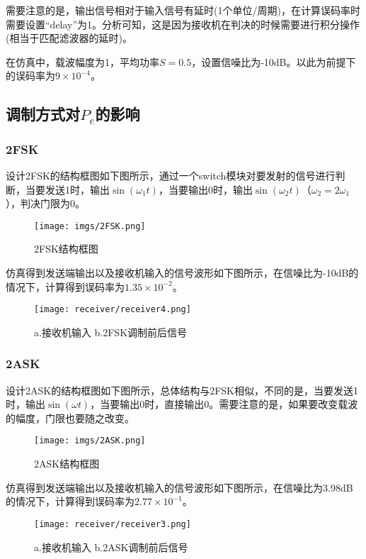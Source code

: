 \documentclass[a4paper]{article}
\begin{document}
需要注意的是，输出信号相对于输入信号有延时(1个单位/周期)，在计算误码率时需要设置“delay”为1。分析可知，这是因为接收机在判决的时候需要进行积分操作(相当于匹配滤波器的延时)。

在仿真中，载波幅度为1，平均功率$S=0.5$，设置信噪比为-10dB。以此为前提下的误码率为$9\times 10^{-4}$。

\subsection{调制方式对$P_e$的影响}
\subsubsection{2FSK}
设计2FSK的结构框图如下图所示，通过一个switch模块对要发射的信号进行判断，当要发送1时，输出$\sin (\omega_1t)$，当要输出0时，输出$\sin (\omega_2t)$（$\omega_2=2\omega_1$），判决门限为0。

\newpage

\begin{figure}[htbp]
\centering
\texttt{[image: imgs/2FSK.png]}
\caption{2FSK结构框图}
\end{figure}

仿真得到发送端输出以及接收机输入的信号波形如下图所示，在信噪比为-10dB的情况下，计算得到误码率为$1.35\times 10^{-2}$。

\begin{figure}[htbp]
\centering
\texttt{[image: receiver/receiver4.png]}
\caption{a.接收机输入 b.2FSK调制前后信号}
\end{figure}


\subsubsection{2ASK}
设计2ASK的结构框图如下图所示，总体结构与2FSK相似，不同的是，当要发送1时，输出$\sin (\omega t)$，当要输出0时，直接输出0。需要注意的是，如果要改变载波的幅度，门限也要随之改变。
\begin{figure}[htbp]
\centering
\texttt{[image: imgs/2ASK.png]}
\caption{2ASK结构框图}
\end{figure}
\newpage

仿真得到发送端输出以及接收机输入的信号波形如下图所示，在信噪比为3.98dB的情况下，计算得到误码率为$2.77\times 10^{-1}$。


\begin{figure}[htbp]
\centering
\texttt{[image: receiver/receiver3.png]}
\caption{a.接收机输入 b.2ASK调制前后信号}
\end{figure}
\end{document}

